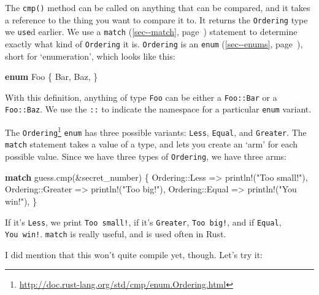 \documentclass[a4paper,]{book}
\renewcommand*{\hyperref}[2][\ar]{%
  \def\ar{#2}%
  #2 (\autoref{#1}, page~\pageref{#1})}
\newenvironment{Shaded}{\begin{snugshade}}{\end{snugshade}}
\newcommand{\KeywordTok}[1]{\textcolor[rgb]{0.13,0.29,0.53}{\textbf{{#1}}}}
\newcommand{\StringTok}[1]{\textcolor[rgb]{0.31,0.60,0.02}{{#1}}}
\newcommand{\OtherTok}[1]{\textcolor[rgb]{0.56,0.35,0.01}{{#1}}}
\newcommand{\NormalTok}[1]{{#1}}
\renewcommand{\href}[2]{#2\footnote{\url{#1}}}
\begin{document}
The \texttt{cmp()} method can be called on anything that can be
compared, and it takes a reference to the thing you want to compare it
to. It returns the \texttt{Ordering} type we \texttt{use}d earlier. We
use a \hyperref[sec--match]{\texttt{match}} statement to determine
exactly what kind of \texttt{Ordering} it is. \texttt{Ordering} is an
\hyperref[sec--enums]{\texttt{enum}}, short for `enumeration', which
looks like this:

\begin{Shaded}
\begin{Highlighting}[]
\KeywordTok{enum} \NormalTok{Foo \{}
    \NormalTok{Bar,}
    \NormalTok{Baz,}
\NormalTok{\}}
\end{Highlighting}
\end{Shaded}

With this definition, anything of type \texttt{Foo} can be either a
\texttt{Foo::Bar} or a \texttt{Foo::Baz}. We use the \texttt{::} to
indicate the namespace for a particular \texttt{enum} variant.

The
\href{http://doc.rust-lang.org/std/cmp/enum.Ordering.html}{\texttt{Ordering}}
\texttt{enum} has three possible variants: \texttt{Less},
\texttt{Equal}, and \texttt{Greater}. The \texttt{match} statement takes
a value of a type, and lets you create an `arm' for each possible value.
Since we have three types of \texttt{Ordering}, we have three arms:

\begin{Shaded}
\begin{Highlighting}[]
\KeywordTok{match} \NormalTok{guess.cmp(&secret_number) \{}
    \NormalTok{Ordering::Less    => }\OtherTok{println!}\NormalTok{(}\StringTok{"Too small!"}\NormalTok{),}
    \NormalTok{Ordering::Greater => }\OtherTok{println!}\NormalTok{(}\StringTok{"Too big!"}\NormalTok{),}
    \NormalTok{Ordering::Equal   => }\OtherTok{println!}\NormalTok{(}\StringTok{"You win!"}\NormalTok{),}
\NormalTok{\}}
\end{Highlighting}
\end{Shaded}

If it's \texttt{Less}, we print \texttt{Too\ small!}, if it's
\texttt{Greater}, \texttt{Too\ big!}, and if \texttt{Equal},
\texttt{You\ win!}. \texttt{match} is really useful, and is used often
in Rust.

I did mention that this won't quite compile yet, though. Let's try it:
\end{document}
